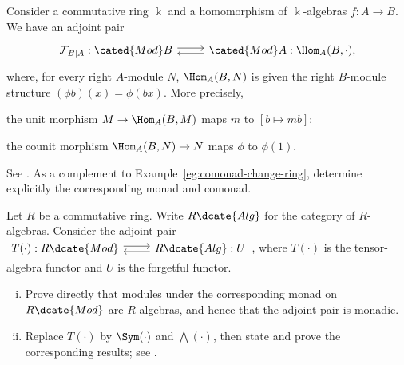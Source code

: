 	\item Consider a commutative ring $\Bbbk$ and a homomorphism of
	$\Bbbk$-algebras $f:A\to B$. We have an adjoint pair
	\[\begin{tikzcd}
		\mathcal{F}_{B|A}: \cated{Mod}B \arrow[shift left, r] & \cated{Mod}A: \Hom_A(B, \cdot), \arrow[shift left, l]
	\end{tikzcd}\]
	where, for every right $A$-module $N$, $\Hom_A(B,N)$ is given the right
	$B$-module structure $(\phi b)(x)=\phi(bx)$. More precisely,
	\begin{compactitem}
		\item the unit morphism $M\to\Hom_A(B,M)$ maps $m$ to $[b\mapsto mb]$;
		\item the counit morphism $\Hom_A(B,N)\to N$ maps $\phi$ to $\phi(1)$.
	\end{compactitem}
	See \cite[Corollary 6.6.8]{Li1}. As a complement to
	Example~\ref{eg:comonad-change-ring}, determine explicitly the
	corresponding monad and comonad.

	\item Let $R$ be a commutative ring. Write $R\dcate{Alg}$ for the category
	of $R$-algebras. Consider the adjoint pair
	$\begin{tikzcd}
		T(\cdot): R\dcate{Mod} \arrow[shift left, r] & R\dcate{Alg}: U \arrow[shift left, l]
	\end{tikzcd}$,
	where $T(\mathord\cdot)$ is the tensor-algebra functor and $U$ is the
	forgetful functor.
	\begin{enumerate}[(i)]
		\item Prove directly that modules under the corresponding monad on
		$R\dcate{Mod}$ are $R$-algebras, and hence that the adjoint pair is
		monadic.
		\item Replace $T(\mathord\cdot)$ by $\Sym(\mathord\cdot)$ and
		$\bigwedge(\mathord\cdot)$, then state and prove the corresponding
		results; see \cite[\S 7.6]{Li1}.
	\end{enumerate}

